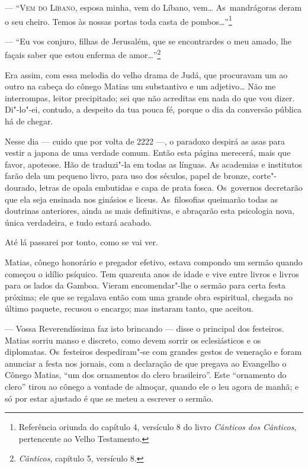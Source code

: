 \begin{linenumbers}

\textsc{--- ``Vem do Líbano,} esposa minha, vem do Líbano, vem\ldots{} As~mandrágoras
deram o seu cheiro. Temos às nossas portas toda casta de
pombos\ldots{}''\footnote{Referência oriunda do capítulo 4, versículo 8 do
  livro \emph{Cânticos dos Cânticos}, pertencente ao Velho Testamento.}

--- ``Eu vos conjuro, filhas de Jerusalém, que se encontrardes o meu
amado, lhe façais saber que estou enferma de amor\ldots{}''\footnote{\emph{Cânticos},
  capítulo 5, versículo 8.}

Era assim, com essa melodia do velho drama de Judá, que procuravam um ao
outro na cabeça do cônego Matias um substantivo e um adjetivo\ldots{} Não me
interrompas, leitor precipitado; sei que não acreditas em nada do que
vou dizer. Di"-lo"-ei, contudo, a despeito da tua pouca fé, porque o dia
da conversão pública há de chegar.

Nesse dia --- cuido que por volta de 2222 ---, o paradoxo despirá as asas
para vestir a japona de uma verdade comum. Então esta página merecerá,
mais que favor, apoteose. Hão de traduzi"-la em todas as línguas. As
academias e institutos farão dela um pequeno livro, para uso dos
séculos, papel de bronze, corte"-dourado, letras de opala embutidas e
capa de prata fosca. Os~governos decretarão que ela seja ensinada nos
ginásios e liceus. As~filosofias queimarão todas as doutrinas
anteriores, ainda as mais definitivas, e abraçarão esta psicologia nova,
única verdadeira, e tudo estará acabado.

Até lá passarei por tonto, como se vai ver.

Matias, cônego honorário e pregador efetivo, estava compondo um sermão
quando começou o idílio psíquico. Tem quarenta anos de idade e vive
entre livros e livros para os lados da Gamboa. Vieram encomendar"-lhe o
sermão para certa festa próxima; ele que se regalava então com uma
grande obra espiritual, chegada no último paquete, recusou o encargo;
mas instaram tanto, que aceitou.

--- Vossa Reverendíssima faz isto brincando --- disse o principal dos
festeiros. Matias sorriu manso e discreto, como devem sorrir os
eclesiásticos e os diplomatas. Os~festeiros despediram"-se com grandes
gestos de veneração e foram anunciar a festa nos jornais, com a
declaração de que pregava ao Evangelho o Cônego Matias, ``um dos
ornamentos do clero brasileiro''. Este ``ornamento do clero'' tirou ao
cônego a vontade de almoçar, quando ele o leu agora de manhã; e só por
estar ajustado é que se meteu a escrever o sermão.


\end{linenumbers}
